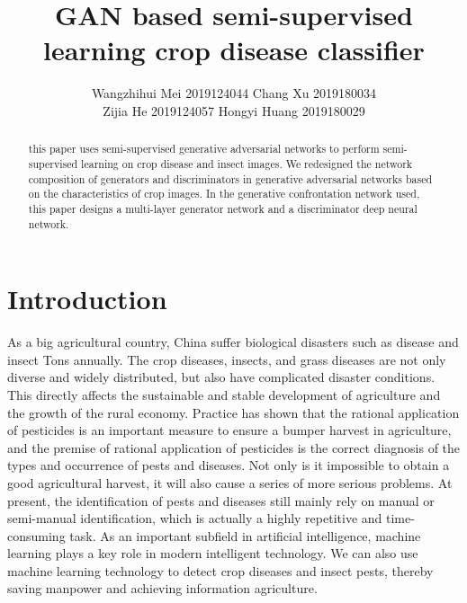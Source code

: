 \documentclass[11pt,en]{elegantpaper}
\title{GAN based semi-supervised learning crop disease classifier}
\author{Wangzhihui Mei 2019124044 Chang Xu 2019180034 \\ Zijia He 2019124057 Hongyi Huang 2019180029}
\institute{CCNU-UOW JI}
\date{}
\begin{document}
\maketitle

\begin{abstract}
	this paper uses semi-supervised generative adversarial networks to perform semi-supervised learning on crop disease and insect images. We redesigned the network composition of generators and discriminators in generative adversarial networks based on the characteristics of crop images. In the generative confrontation network used, this paper designs a multi-layer generator network and a discriminator deep neural network.
\end{abstract}

\section{Introduction}

As a big agricultural country, China suffer biological disasters such as disease and insect Tons annually. The crop diseases, insects, and grass diseases are not only diverse and widely distributed, but also have complicated disaster conditions. This directly affects the sustainable and stable development of agriculture and the growth of the rural economy. Practice has shown that the rational application of pesticides is an important measure to ensure a bumper harvest in agriculture, and the premise of rational application of pesticides is the correct diagnosis of the types and occurrence of pests and diseases. Not only is it impossible to obtain a good agricultural harvest, it will also cause a series of more serious problems. At present, the identification of pests and diseases still mainly rely on manual or semi-manual identification, which is actually a highly repetitive and time-consuming task. As an important subfield in artificial intelligence, machine learning plays a key role in modern intelligent technology. We can also use machine learning technology to detect crop diseases and insect pests, thereby saving manpower and achieving information agriculture.
\end{document}
